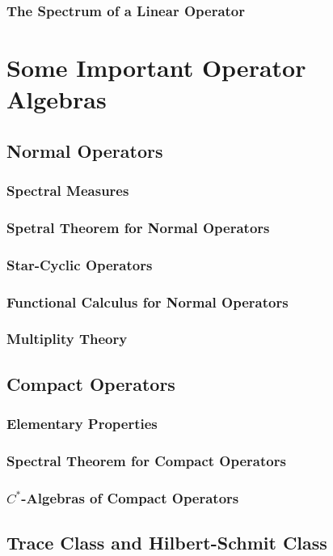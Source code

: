 \documentclass[a4paper, 11pt]{report}
\begin{document}
	\subsection{The Spectrum of a Linear Operator}


	\chapter{Some Important Operator Algebras}

	\section{Normal Operators}
	\subsection{Spectral Measures}
	\subsection{Spetral Theorem for Normal Operators}
	\subsection{Star-Cyclic Operators}
	\subsection{Functional Calculus for Normal Operators}
	\subsection{Multiplity Theory}

	\section{Compact Operators}
	\subsection{Elementary Properties}
	\subsection{Spectral Theorem for Compact Operators}
	\subsection{$C^*$-Algebras of Compact Operators}

	\section{Trace Class and Hilbert-Schmit Class}
\end{document}
